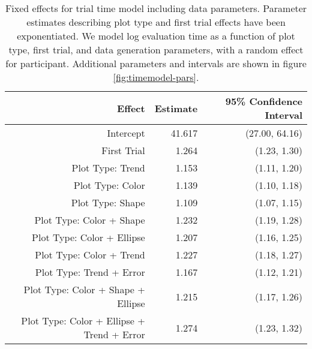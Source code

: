 \begin{table}[ht]
\centering
\caption[Fixed effects for trial time model including data parameters]{Fixed effects for trial time model including data parameters. Parameter estimates describing plot type and first trial effects have been exponentiated. We model log evaluation time as a function of plot type, first trial, and data generation parameters, with a random effect for participant. Additional parameters and intervals are shown in figure \ref{fig:timemodel-pars}.} 
\label{tab:timemodel-pars}
\begin{tabular}{rrr}
  \hline
Effect & Estimate & 95\% Confidence Interval \\ 
  \hline
Intercept & 41.617 & (27.00, 64.16) \\ 
  First Trial & 1.264 & (1.23, 1.30) \\ 
  Plot Type: Trend & 1.153 & (1.11, 1.20) \\ 
  Plot Type: Color & 1.139 & (1.10, 1.18) \\ 
  Plot Type: Shape & 1.109 & (1.07, 1.15) \\ 
  Plot Type: Color + Shape & 1.232 & (1.19, 1.28) \\ 
  Plot Type: Color + Ellipse & 1.207 & (1.16, 1.25) \\ 
  Plot Type: Color + Trend & 1.227 & (1.18, 1.27) \\ 
  Plot Type: Trend + Error & 1.167 & (1.12, 1.21) \\ 
  Plot Type: Color + Shape + Ellipse & 1.215 & (1.17, 1.26) \\ 
  Plot Type: Color + Ellipse + Trend + Error & 1.274 & (1.23, 1.32) \\ 
   \hline
\end{tabular}
\end{table}
